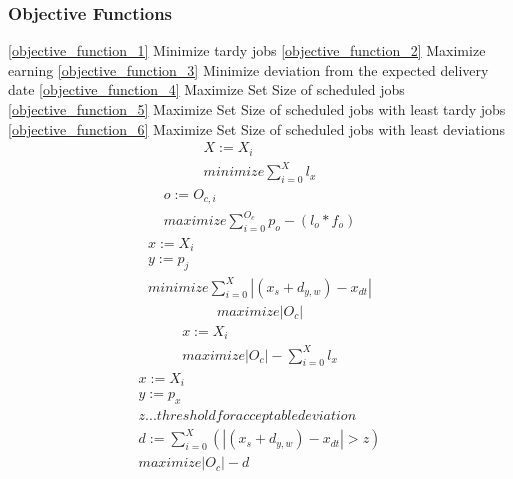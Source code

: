\documentclass[a4paper,12pt,twoside]{scrreprt}
\begin{document}
\subsubsection*{Objective Functions}
\begin{flushleft}
\autoref{objective_function_1} Minimize tardy jobs\linebreak
\autoref{objective_function_2} Maximize earning\linebreak
\autoref{objective_function_3} Minimize deviation from the expected delivery date\linebreak
\autoref{objective_function_4} Maximize Set Size of scheduled jobs\linebreak
\autoref{objective_function_5} Maximize Set Size of scheduled jobs with least tardy jobs\linebreak
\autoref{objective_function_6} Maximize Set Size of scheduled jobs with least deviations\linebreak
	\begin{equation}
	\label{objective_function_1}
	\begin{split}
		X := X_{i} \\
		minimize \sum_{i=0}^{X}l_{x} 
	\end{split}
	\end{equation}
	\begin{equation}
	\label{objective_function_2}
	\begin{split}
		o := O_{c,i} \\
		maximize \sum_{i=0}^{O_{c}}p_{o} - (l_{o} * f_{o})
	\end{split}
	\end{equation}
	\begin{equation}
	\label{objective_function_3}
	\begin{split}
		x := X_{i} \\
		y := p_{j} \\
		minimize \sum_{i=0}^{X} |(x_{s} + d_{y,w}) - x_{dt}|
	\end{split}
	\end{equation}
	\begin{equation}
	\label{objective_function_4}
	\begin{split}
		maximize |O_{c}|
	\end{split}
	\end{equation}
	\begin{equation}
	\label{objective_function_5}
	\begin{split}
		x := X_{i} \\
		maximize |O_{c}| - \sum_{i=0}^{X}l_{x}
	\end{split}
	\end{equation}
	\begin{equation}
	\label{objective_function_6}
	\begin{split}
		x := X_{i} \\
		y := p_{x} \\
		z ... threshold for acceptable deviation \\
		d := \sum_{i=0}^{X} (|(x_{s} + d_{y,w}) - x_{dt}| > z)\\
		maximize |O_{c}| - d
	\end{split}
	\end{equation}
\end{flushleft}
\end{document}
